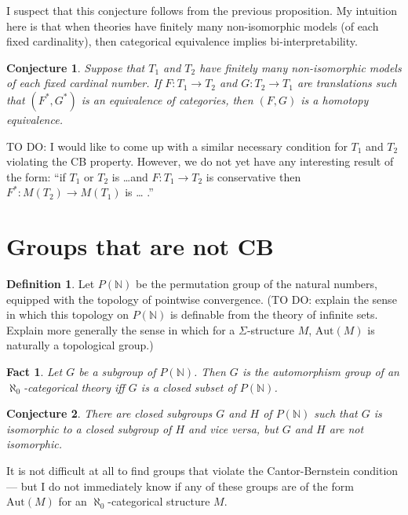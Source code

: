 \documentclass[12pt]{article}
\newtheorem*{conj}{Conjecture}
\newtheorem*{fact}{Fact}
\theoremstyle{definition}
\newtheorem*{defn}{Definition}
\newcommand{\3}{\mathcal}
\begin{document}
I suspect that this conjecture follows from the previous
proposition. My intuition here is that when theories have finitely
many non-isomorphic models (of each fixed cardinality), then
categorical equivalence implies bi-interpretability.

\begin{conj} Suppose that $T_1$ and $T_2$ have finitely many
  non-isomorphic models of each fixed cardinal number. If
  $F:T_1\to T_2$ and $G:T_2\to T_1$ are translations such that
  $(F^*,G^*)$ is an equivalence of categories, then $(F,G)$ is a
  homotopy equivalence. \end{conj}


TO DO: I would like to come up with a similar necessary condition for
$T_1$ and $T_2$ violating the CB property. However, we do not yet have
any interesting result of the form: ``if $T_1$ or $T_2$ is \dots and
$F:T_1\to T_2$ is conservative then $F^*:M(T_2)\to M(T_1)$ is \dots
.''



\section{Groups that are not CB}

\begin{defn} Let $P(\mathbb{N})$ be the permutation group of the
  natural numbers, equipped with the topology of pointwise
  convergence. (TO DO: explain the sense in which this topology on
  $P(\mathbb{N})$ is definable from the theory of infinite
  sets. Explain more generally the sense in which for a
  $\Sigma$-structure $M$, $\mathrm{Aut}(M)$ is naturally a topological
  group.) \end{defn}

\begin{fact} Let $G$ be a subgroup of $P(\mathbb{N})$. Then $G$ is the
  automorphism group of an $\aleph _0$-categorical theory iff $G$ is
  a closed subset of $P(\mathbb{N})$. \end{fact}

\begin{conj} There are closed subgroups $G$ and $H$ of
  $P(\mathbb{N})$ such that $G$ is isomorphic to a closed subgroup of
  $H$ and vice versa, but $G$ and $H$ are not
  isomorphic. \end{conj}

It is not difficult at all to find groups that violate the
Cantor-Bernstein condition --- but I do not immediately know if any of
these groups are of the form $\mathrm{Aut}(M)$ for an
$\aleph _0$-categorical structure $M$.
\end{document}
